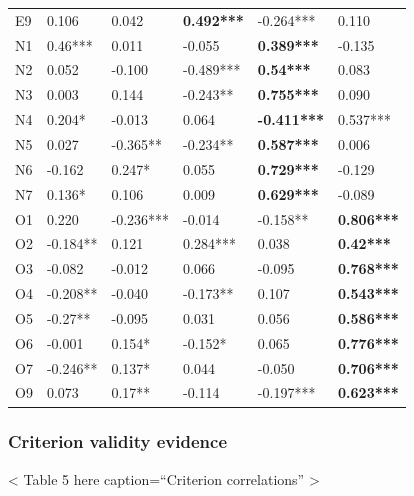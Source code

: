 \documentclass[man]{apa6}
\theoremstyle{definition}
\theoremstyle{definition}
\theoremstyle{definition}
\theoremstyle{remark}
\begin{document}
\begin{table}[ht]
\begin{tabular}{llllll}
  E9 & 0.106 & 0.042 & \textbf{0.492***} & -0.264*** & 0.110 \\ 
  N1 & 0.46*** & 0.011 & -0.055 & \textbf{0.389***} & -0.135 \\ 
  N2 & 0.052 & -0.100 & -0.489*** & \textbf{0.54***} & 0.083 \\ 
  N3 & 0.003 & 0.144 & -0.243** & \textbf{0.755***} & 0.090 \\ 
  N4 & 0.204* & -0.013 & 0.064 & \textbf{-0.411***} & 0.537*** \\ 
  N5 & 0.027 & -0.365** & -0.234** & \textbf{0.587***} & 0.006 \\ 
  N6 & -0.162 & 0.247* & 0.055 & \textbf{0.729***} & -0.129 \\ 
  N7 & 0.136* & 0.106 & 0.009 & \textbf{0.629***} & -0.089 \\ 
  O1 & 0.220 & -0.236*** & -0.014 & -0.158** & \textbf{0.806***} \\ 
  O2 & -0.184** & 0.121 & 0.284*** & 0.038 & \textbf{0.42***} \\ 
  O3 & -0.082 & -0.012 & 0.066 & -0.095 & \textbf{0.768***} \\ 
  O4 & -0.208** & -0.040 & -0.173** & 0.107 & \textbf{0.543***} \\ 
  O5 & -0.27** & -0.095 & 0.031 & 0.056 & \textbf{0.586***} \\ 
  O6 & -0.001 & 0.154* & -0.152* & 0.065 & \textbf{0.776***} \\ 
  O7 & -0.246** & 0.137* & 0.044 & -0.050 & \textbf{0.706***} \\ 
  O9 & 0.073 & 0.17** & -0.114 & -0.197*** & \textbf{0.623***} \\ 
   \hline
\end{tabular}
\endgroup
\end{table}

\hypertarget{criterion-validity-evidence-1}{%
\subsubsection{Criterion validity
evidence}\label{criterion-validity-evidence-1}}

\textless{} Table 5 here caption=\enquote{Criterion correlations}
\textgreater{}
\end{document}
